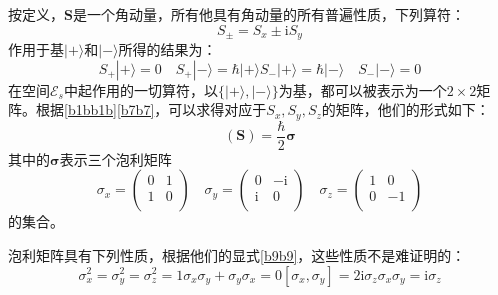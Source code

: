 \documentclass[]{article}
\begin{document}
按定义，$\boldsymbol{S}$是一个角动量，所有他具有角动量的所有普遍性质，下列算符：
\begin{equation}
	S_\pm=S_x\pm\mathrm{i}S_y
\end{equation}
作用于基$|+\rangle$和$|-\rangle$所得的结果为：
\begin{subequations}
	\begin{equation}
		S_+|+\rangle=0\quad S_+|-\rangle=\hbar|+\rangle
	\end{equation}
	\begin{equation}
		S_-|+\rangle=\hbar|-\rangle\quad S_-|-\rangle=0
	\end{equation}
	\label{b7b7}
\end{subequations}
在空间$\mathscr{E}_s$中起作用的一切算符，以$\{|+\rangle,|-\rangle\}$为基，都可以被表示为一个$2\times2$矩阵。根据\eqref{b1bb1b}\eqref{b7b7}，可以求得对应于$S_x,S_y,S_z$的矩阵，他们的形式如下：
\begin{equation}
	(\boldsymbol{S})=\dfrac{\hbar}{2}\boldsymbol{\sigma}
	\label{b8b8}
\end{equation}
其中的$\boldsymbol{\sigma}$表示三个泡利矩阵
\begin{equation}
	\sigma_x=\begin{pmatrix}
		0&1\\
		1&0\\
	\end{pmatrix}\quad \sigma_y=\begin{pmatrix}
		0&-\mathrm{i}\\
		\mathrm{i}&0\\
	\end{pmatrix}\quad \sigma_z=\begin{pmatrix}
	1&0\\
	0&-1\\
	\end{pmatrix}
	\label{b9b9}
\end{equation}
的集合。\par 
泡利矩阵具有下列性质，根据他们的显式\eqref{b9b9}，这些性质不是难证明的：
\begin{subequations}
	\begin{equation}
		\sigma_x^2=\sigma_y^2=\sigma_z^2=1
	\end{equation}
	\begin{equation}
		\sigma_x\sigma_y+\sigma_y\sigma_x=0
	\end{equation}
	\begin{equation}
		[\sigma_x,\sigma_y]=2\mathrm{i}\sigma_z
	\end{equation}
	\begin{equation}
		\sigma_x\sigma_y=\mathrm{i}\sigma_z
	\end{equation}
	\label{b10b10}
\end{subequations}
\end{document}
